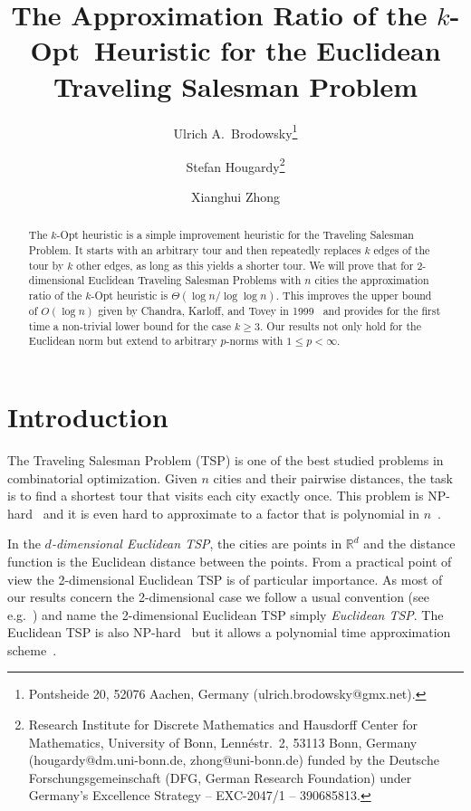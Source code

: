 \documentclass[a4paper, 11pt]{article}
\title{The Approximation Ratio of the $k$-Opt~Heuristic for the Euclidean Traveling Salesman Problem}
\author{Ulrich A.\ Brodowsky\thanks{Pontsheide 20, 52076 Aachen, Germany ({ulrich.brodowsky@gmx.net}).} 
\and Stefan Hougardy\thanks{Research Institute for Discrete Mathematics and Hausdorff Center for Mathematics, University of Bonn, Lenn\'estr.~2, 53113 Bonn, Germany ({hougardy@dm.uni-bonn.de}, {zhong@uni-bonn.de})
{funded by the Deutsche Forschungsgemeinschaft (DFG, German Research Foundation) under Germany's Excellence Strategy -- EXC-2047/1 -- 390685813.}
}
\and Xianghui Zhong\footnotemark[2]
}
\def\blue#1{#1}
\begin{document}
\maketitle



\begin{abstract}
The $k$-Opt heuristic is a simple improvement heuristic for the Traveling Salesman Problem.
It starts with an arbitrary tour and then repeatedly replaces $k$ edges of the tour  
by $k$ other edges, as long as this yields a shorter tour. 
We will prove that for 2-dimensional Euclidean Traveling Salesman Problems with $n$ cities 
the approximation ratio of the $k$-Opt heuristic is $\Theta(\log n / \log \log n)$. 
This improves the upper bound of $O(\log n)$ given by Chandra, Karloff, and Tovey in 1999~\cite{CKT1999}
and provides for the first time a non-trivial lower bound for the case $k\ge 3$. Our results not only hold
for the Euclidean norm but extend to arbitrary $p$-norms \blue{with $1 \le p < \infty$}. 
\end{abstract}







\section{Introduction}

The Traveling Salesman Problem (TSP) is one of the best studied problems in combinatorial optimization.
Given $n$ cities and their pairwise distances, the task is to find a shortest tour that visits each city exactly once.
This problem is NP-hard~\cite{GJ1979} and it is even hard to approximate to a factor that is polynomial in $n$~\cite{SG1976}.


In the \emph{$d$-dimensional Euclidean TSP}, the cities are points in $\mathbb{R}^d$ and the distance function is the Euclidean distance between the points. From a practical point of view the 2-dimensional Euclidean TSP is of particular importance. 
As most of our results concern the 2-dimensional case we follow a usual convention (see e.g.~\cite{Rei1994}) and  
name the 2-dimensional Euclidean TSP simply \emph{Euclidean TSP}. 
\blue{The Euclidean TSP is also NP-hard~\cite{Pap1977} but it allows a polynomial time approximation scheme~\cite{Aro1998,Mit1999}.}
\end{document}
